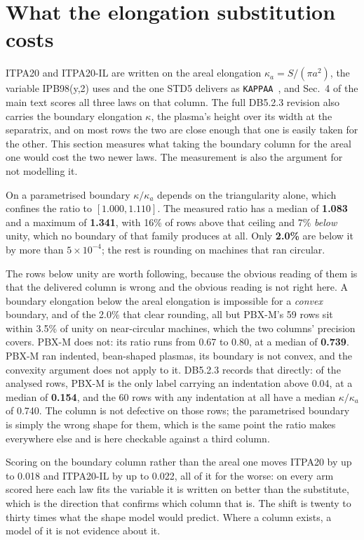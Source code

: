 \documentclass[12pt,letterpaper]{article}
\begin{document}
\section{What the elongation substitution costs}
\label{supp:elongation}

ITPA20 and ITPA20-IL are written on the areal elongation $\kappa_a =
S/(\pi a^2)$, the variable IPB98(y,2) uses and the one STD5 delivers as
\texttt{KAPPAA}~\cite{hdb5}, and Sec.~4 of the main text scores all three
laws on that column. The full DB5.2.3 revision also carries the boundary
elongation $\kappa$, the plasma's height over its width at the separatrix, and
on most rows the two are close enough that one is easily taken for the other.
This section measures what taking the boundary column for the areal one would
cost the two newer laws. The measurement is also the argument for not
modelling it.

On a parametrised boundary $\kappa/\kappa_a$ depends on the triangularity
alone, which confines the ratio to $[1.000, 1.110]$. The measured ratio has a
median of \textbf{1.083} and a maximum of \textbf{1.341}, with 16\% of rows
above that ceiling and 7\% \emph{below} unity, which no boundary of that family
produces at all. Only \textbf{2.0\%} are below it by more than
$5\times10^{-4}$; the rest is rounding on machines that ran circular.

The rows below unity are worth following, because the obvious reading of them is
that the delivered column is wrong and the obvious reading is not right here. A
boundary elongation below the areal elongation is impossible for a \emph{convex}
boundary, and of the 2.0\% that clear rounding, all but PBX-M's 59 rows sit
within 3.5\% of unity on near-circular machines, which the two columns'
precision covers. PBX-M does not: its ratio runs from 0.67 to 0.80, at a median
of \textbf{0.739}. PBX-M ran indented, bean-shaped plasmas, its boundary is not
convex, and the convexity argument does not apply to it. DB5.2.3 records that
directly: of the analysed rows, PBX-M is the only label carrying an indentation
above 0.04, at a median of \textbf{0.154}, and the 60 rows with any indentation
at all have a median $\kappa/\kappa_a$ of 0.740. The column is not defective on
those rows; the parametrised boundary is simply the wrong shape for them, which
is the same point the ratio makes everywhere else and is here checkable against
a third column.

Scoring on the boundary column rather than the areal one moves ITPA20 by up
to 0.018 and ITPA20-IL by up to 0.022, all of it for the worse: on every arm
scored here each law fits the variable it is written on better than the
substitute, which is the direction that confirms which column that is. The
shift is twenty to thirty times what the shape model would predict. Where a
column exists, a model of it is not evidence about it.
\end{document}
